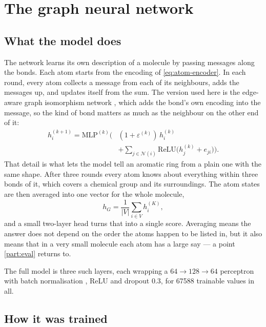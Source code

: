 \section{The graph neural network}
\label{part:net}

\subsection{What the model does}

The network learns its own description of a molecule by passing messages along the bonds. Each atom starts from the encoding of \cref{eq:atom-encoder}. In each round, every atom collects a message from each of its neighbours, adds the messages up, and updates itself from the sum. The version used here is the edge-aware graph isomorphism network \parencite{GIN,GINE}, which adds the bond's own encoding into the message, so the kind of bond matters as much as the neighbour on the other end of it:
\begin{equation}
    \begin{split}
        h_i^{(k+1)} = \mathrm{MLP}^{(k)}\Big( &(1+\varepsilon^{(k)})\, h_i^{(k)} \\
        &+ \sum_{j \in \mathcal{N}(i)} \mathrm{ReLU}\big(h_j^{(k)} + e_{ji}\big) \Big).
    \end{split}
    \label{eq:gine}
\end{equation}
That detail is what lets the model tell an aromatic ring from a plain one with the same shape. After three rounds every atom knows about everything within three bonds of it, which covers a chemical group and its surroundings. The atom states are then averaged into one vector for the whole molecule,
\begin{equation}
    h_G = \frac{1}{|V|} \sum_{i \in V} h_i^{(K)},
    \label{eq:pool}
\end{equation}
and a small two-layer head turns that into a single score. Averaging means the answer does not depend on the order the atoms happen to be listed in, but it also means that in a very small molecule each atom has a large say --- a point \ref{part:eval} returns to.

The full model is three such layers, each wrapping a $64 \to 128 \to 64$ perceptron with batch normalisation \parencite{BatchNorm}, ReLU and dropout 0.3, for \num{67588} trainable values in all.

\subsection{How it was trained}


